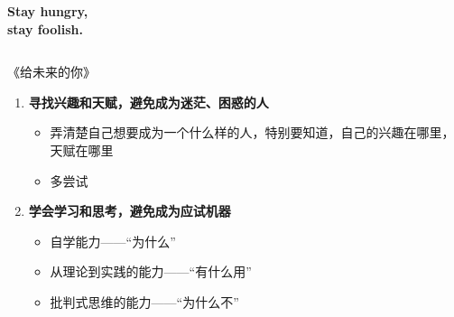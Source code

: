 \begin{frame}
	\linespread{1.5}
	\begin{columns}
			\begin{center}
				{
				\bf\Large Stay hungry,\\[5pt]
				stay foolish.
				}
			\end{center}
			\begin{center}
			\end{center}
	\end{columns}
\end{frame}

\begin{frame}[<+->]{《给未来的你》}
	\linespread{1.4}\pause 
	\begin{enumerate}
	  \item {\bf 寻找兴趣和天赋，避免成为迷茫、困惑的人}
	  \begin{itemize}
	    \item 弄清楚自己想要成为一个什么样的人，特别要知道，自己的兴趣在哪里，天赋在哪里
	    \item \alert{多尝试}
	  \end{itemize}
	  \item {\bf 学会学习和思考，避免成为应试机器}
	  \begin{itemize}
	    \item 自学能力\pause ——\alert{“为什么”}\pause 
	    \item 从理论到实践的能力\pause ——\alert{“有什么用”}\pause 
	    \item 批判式思维的能力\pause ——\alert{“为什么不”}
	  \end{itemize}
	\end{enumerate}
\end{frame}

